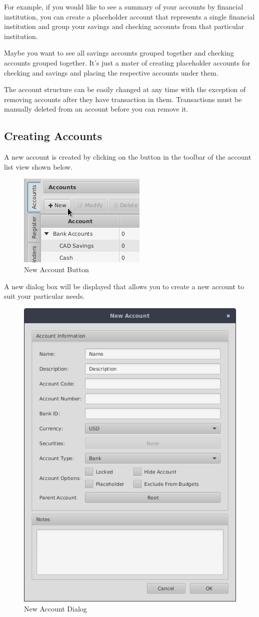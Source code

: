 \documentclass[letterpaper,12pt]{book}
\begin{document}
    For example, if you would like to see a summary of your accounts by financial institution, you can create a placeholder
    account that represents a single financial institution and group your savings and checking accounts from that particular
    institution.

    Maybe you want to see all savings accounts grouped together and checking accounts grouped together.
    It's just a mater of creating placeholder accounts for checking and savings and placing the respective accounts under them.

    The account structure can be easily changed at any time with the exception of removing accounts after they have
    transaction in them.
    Transactions must be manually deleted from an account before you can remove it.

    \subsection{Creating Accounts}
    \label{subsec:creatingaccounts}
    A new account is created by clicking on the  button in the toolbar of the account list view shown below.

    \begin{figure}[h]
        \caption{New Account Button}
        \includegraphics[width=0.4\linewidth]{images/new-account}
    \end{figure}

    A new dialog box will be displayed that allows you to create a new account to suit your particular needs.

    \begin{figure}[h]
        \caption{New Account Dialog}
        \includegraphics[width=0.55\linewidth]{images/account-dialog}
    \end{figure}
\end{document}

